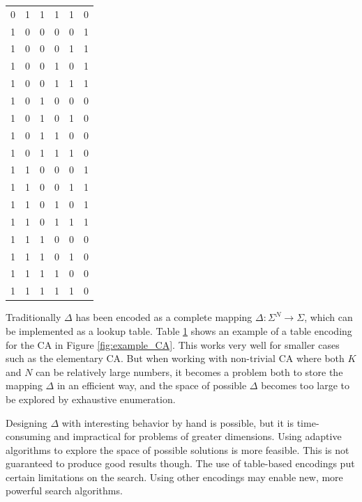 \begin{table}
\begin{tabular}{ccccc|c}
    0      & 1      & 1      & 1      & 1      & 0        \\
    1      & 0      & 0      & 0      & 0      & 1        \\
    1      & 0      & 0      & 0      & 1      & 1        \\
    1      & 0      & 0      & 1      & 0      & 1        \\
    1      & 0      & 0      & 1      & 1      & 1        \\
    1      & 0      & 1      & 0      & 0      & 0        \\
    1      & 0      & 1      & 0      & 1      & 0        \\
    1      & 0      & 1      & 1      & 0      & 0        \\
    1      & 0      & 1      & 1      & 1      & 0        \\
    1      & 1      & 0      & 0      & 0      & 1        \\
    1      & 1      & 0      & 0      & 1      & 1        \\
    1      & 1      & 0      & 1      & 0      & 1        \\
    1      & 1      & 0      & 1      & 1      & 1        \\
    1      & 1      & 1      & 0      & 0      & 0        \\
    1      & 1      & 1      & 0      & 1      & 0        \\
    1      & 1      & 1      & 1      & 0      & 0        \\
    1      & 1      & 1      & 1      & 1      & 0        \\
    \end{tabular}
    \label{tbl:example_CA}
\end{table}

Traditionally $\Delta$ has been encoded as a complete mapping $\Delta: \Sigma^N \rightarrow \Sigma$, which can be implemented as a lookup table.
Table \ref{tbl:example_CA} shows an example of a table encoding for the CA in Figure \ref{fig:example_CA}.
This works very well for smaller cases such as the elementary CA.
But when working with non-trivial CA where both $K$ and $N$ can be relatively large numbers,
it becomes a problem both to store the mapping $\Delta$ in an efficient way,
and the space of possible $\Delta$ becomes too large to be explored by exhaustive enumeration.

Designing $\Delta$ with interesting behavior by hand is possible,
but it is time-consuming and impractical for problems of greater dimensions.
Using adaptive algorithms to explore the space of possible solutions is more feasible.
This is not guaranteed to produce good results though.
The use of table-based encodings put certain limitations on the search.
Using other encodings may enable new, more powerful search algorithms.

